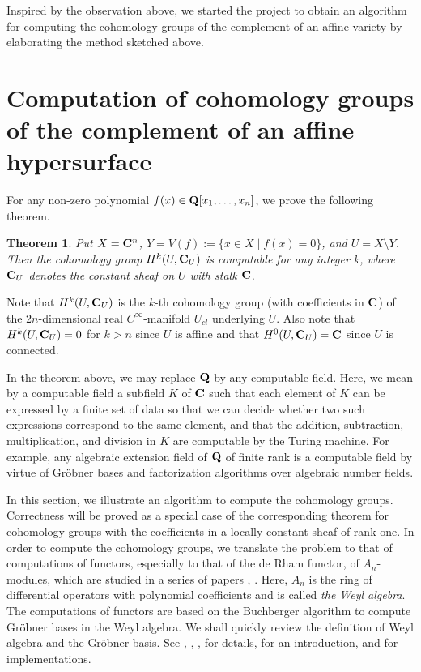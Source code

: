 \documentclass[12pt]{article}
\def\C{{\bf C}}
\def\Q{{\bf Q}}
\newtheorem{theorem}{Theorem}[section]
\begin{document}
Inspired by the observation above, we started the project 
to obtain an algorithm for computing the cohomology groups
of the complement 
of an affine variety by elaborating the method sketched above. 


\section{Computation of cohomology groups of the complement of an affine hypersurface}

For any non-zero polynomial $f(x) \in \Q[x_1, \ldots, x_n]$,
we  prove the following theorem.

\begin{theorem} \label{theorem:constantSheaf}
Put $X = \C^n$, $Y = V(f) := \{x \in X \mid f(x)= 0\}$, 
and $U = X \setminus Y$.   
Then the cohomology group $H^k(U,\C_U)$ is computable for any integer $k$, 
where $\C_U$ denotes the constant sheaf on $U$ with stalk $\C$. 
\end{theorem}

Note that  $H^k(U,\C_U)$ is the $k$-th cohomology group (with coefficients in 
$\C$) of the $2n$-dimensional real $C^\infty$-manifold $U_{cl}$ underlying
$U$.
Also note that $H^k(U,\C_U) = 0$ for $k > n$ since $U$ is affine
and that $H^0(U,\C_U) = \C$ since $U$ is connected.

In the theorem above, we may replace $\Q$ by any computable field.
Here, we mean by a computable field a subfield $K$ of $\C$ such that 
each element of $K$ can be expressed by a finite set of data so that
we can decide whether two such expressions correspond to the same element, 
and that the addition, subtraction, multiplication, and division 
in $K$ are computable by the Turing machine.
For example, any algebraic extension field of $\Q$ of finite rank is
a computable field by virtue of Gr\"obner bases and factorization 
algorithms over algebraic number fields. 

In this section, we illustrate an algorithm to compute 
the cohomology groups.
Correctness will be proved as a special case of the corresponding theorem
for cohomology groups with the coefficients in a locally constant
sheaf of rank one.
In order to compute the cohomology groups,
we translate the problem to that of
computations of functors, especially to that of the de Rham functor,
of $A_n$-modules,
which are studied in a series of papers \cite{OakuAdvance}, \cite{OakuAdvance2}.
Here, $A_n$ is the ring of differential operators with polynomial
coefficients and is called {\it the Weyl algebra}.
The computations of functors are based on the Buchberger algorithm
to compute Gr\"obner bases in the Weyl algebra.
We shall quickly review the definition of Weyl algebra and
the Gr\"obner basis.
See \cite{Galligo}, \cite{Castro}, \cite{TakayamaJJAM}, \cite{OakuBook} for 
details, \cite{Sturmfels-Takayama} for an introduction,
and \cite{Kan-sm1} for implementations.
\end{document}
